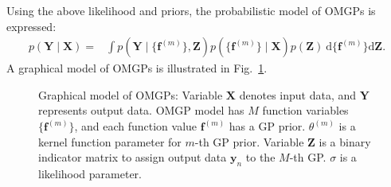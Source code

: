 \documentclass[sn-mathphys-num]{sn-jnl}
\begin{document}
Using the above likelihood and priors, the probabilistic model of OMGPs is expressed:
\begin{align}\label{eq:OM-GPs:model}
     p({\mathbf{Y}}\mid {\mathbf X})
     = & \int p({\mathbf{Y}}\mid \{\mathbf{f}^{(m)}\}, {\mathbf{Z}})  p(\{\mathbf{f}^{(m)}\}\mid\mathbf X)p({\mathbf{Z}}) ~ \mathrm d \{\mathbf f^{(m)}\}\mathrm d \mathbf Z. 
\end{align}
A graphical model of OMGPs is illustrated in Fig.~\ref{fig:graphical:OM-GPs}.

\begin{figure}[t]
    \centering
    \caption{Graphical model of OMGPs: Variable $\mathbf{X}$ denotes input data, and $\mathbf{Y}$ represents output data. OMGP model has $M$ function variables $\{\mathbf{f}^{(m)}\}$, and each function value $\mathbf f^{(m)}$ has a GP prior. $\theta^{(m)}$ is a kernel function parameter for $m$-th GP prior. Variable $\mathbf Z$ is a binary indicator matrix to assign output data $\mathbf y_n$ to the $M$-th GP. $\sigma$ is a likelihood parameter.}
    \label{fig:graphical:OM-GPs}
\end{figure}
\end{document}
